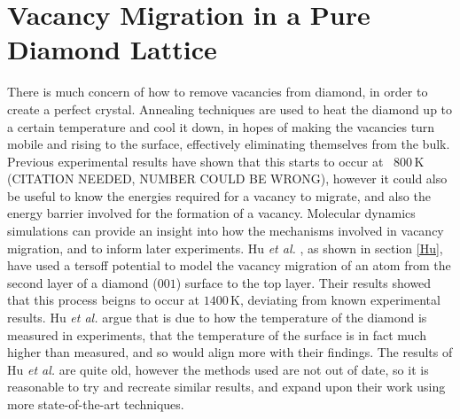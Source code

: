 \documentclass[10pt,a4paper,twocolumn,twoside]{extarticle}
\newcommand{\al}{\emph{et al. }}
\begin{document}



\section{Vacancy Migration in a Pure Diamond Lattice}

There is much concern of how to remove vacancies from diamond, in order to create a perfect crystal. Annealing techniques are used to heat the diamond up to a certain temperature and cool it down, in hopes of making the vacancies turn mobile and rising to the surface, effectively eliminating themselves from the bulk. Previous experimental results have shown that this starts to occur at ~$800$\,K (CITATION NEEDED, NUMBER COULD BE WRONG), however it could also be useful to know the energies required for a vacancy to migrate, and also the energy barrier involved for the formation of a vacancy. Molecular dynamics simulations can provide an insight into how the mechanisms involved in vacancy migration, and to inform later experiments. Hu \al, as shown in section \ref{Hu}, have used a tersoff potential to model the vacancy migration of an atom from the second layer of a diamond ($001$) surface to the top layer. Their results showed that this process beigns to occur at $1400$\,K, deviating from known experimental results. Hu \al argue that is due to how the temperature of the diamond is measured in experiments, that the temperature of the surface is in fact much higher than measured, and so would align more with their findings. The results of Hu \al are quite old, however the methods used are not out of date, so it is reasonable to try and recreate similar results, and expand upon their work using more state-of-the-art techniques. 
\end{document}

